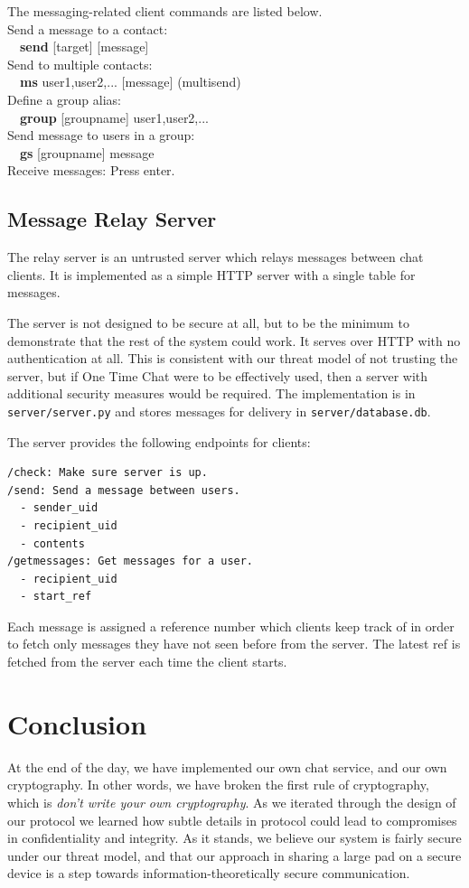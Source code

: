 \documentclass[twocolumn]{article}
\begin{document}
The messaging-related client commands are listed below.\\
Send a message to a contact:\\
\-\ \-\ \textbf{send} [target] [message]\\
Send to multiple contacts:\\
\-\ \-\ \textbf{ms} user1,user2,... [message] (multisend)\\
Define a group alias:\\
\-\ \-\ \textbf{group} [groupname] user1,user2,...\\
Send message to users in a group:\\
\-\ \-\ \textbf{gs} [groupname] message\\
Receive messages:
Press enter.

\subsection{Message Relay Server}
The relay server is an untrusted server which relays messages between chat clients.
It is implemented as a simple HTTP server with a single table for messages.

The server is not designed to be secure at all, but to be the minimum to demonstrate that
the rest of the system could work. It serves over HTTP with no authentication at all.
This is consistent with our threat model of not trusting the server, but if One Time Chat were to be effectively used, then a server with additional security measures would be required. The implementation is in \texttt{server/server.py} and stores messages for delivery in \texttt{server/database.db}.

The server provides the following endpoints for clients:
\begin{lstlisting}
/check: Make sure server is up.
/send: Send a message between users.
  - sender_uid
  - recipient_uid
  - contents
/getmessages: Get messages for a user.
  - recipient_uid
  - start_ref
\end{lstlisting}

Each message is assigned a reference number which clients keep track of in order
to fetch only messages they have not seen before from the server.
The latest ref is fetched from the server each time the client starts.

\section{Conclusion}
At the end of the day, we have implemented our own chat service, and our own cryptography. In other words, we have broken the first rule of cryptography, which is \emph{don't write your own cryptography}. As we iterated through the design of our protocol we learned how subtle details in protocol could lead to compromises in confidentiality and integrity. As it stands, we believe our system is fairly secure under our threat model, and that our approach in sharing a large pad on a secure device is a step towards information-theoretically secure communication.

\end{document}

